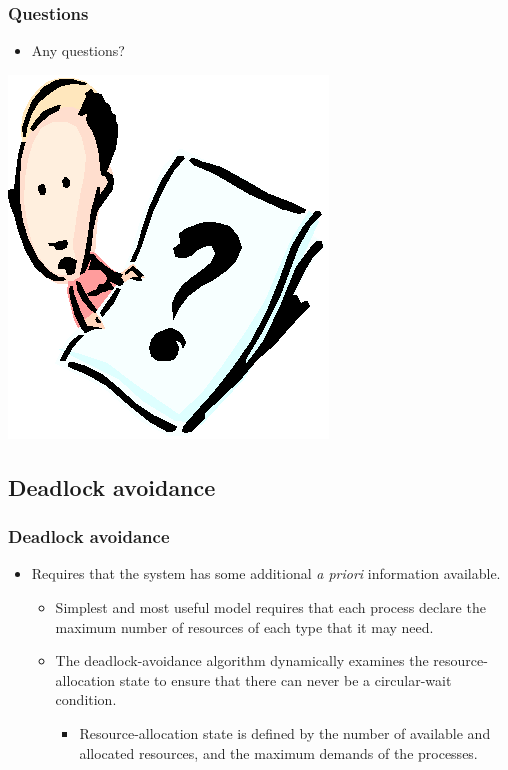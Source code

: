 \documentclass[CJKutf8,xcolor=pdftex,dvipsnames,table]{beamer}
\begin{document}
\begin{CJK*}{UTF8}{song}
\fi

  \begin{frame}
  \frametitle{Questions}
  \begin{itemize}
  \item{Any questions?}
  \end{itemize}
  \begin{center}
    \includegraphics[scale=.5]{question}
  \end{center}
  \end{frame}

\subsection{Deadlock avoidance}

  \begin{frame}
  \frametitle{Deadlock avoidance} \pause
  \begin{itemize}
  \item{Requires that the system has some additional \emph{a priori} information available.} \pause
    \begin{itemize}
    \item{Simplest and most useful model requires that each process declare the maximum number of resources of each type that it may need.} \pause
    \item{The deadlock-avoidance algorithm dynamically examines the resource-allocation state to ensure that there can never be a circular-wait condition.} \pause
      \begin{itemize}
      \item{Resource-allocation state is defined by the number of available and allocated resources, and the maximum demands of the processes.}
      \end{itemize}
    \end{itemize}
  \end{itemize}
  \end{frame}


\end{CJK*}
\end{document}
